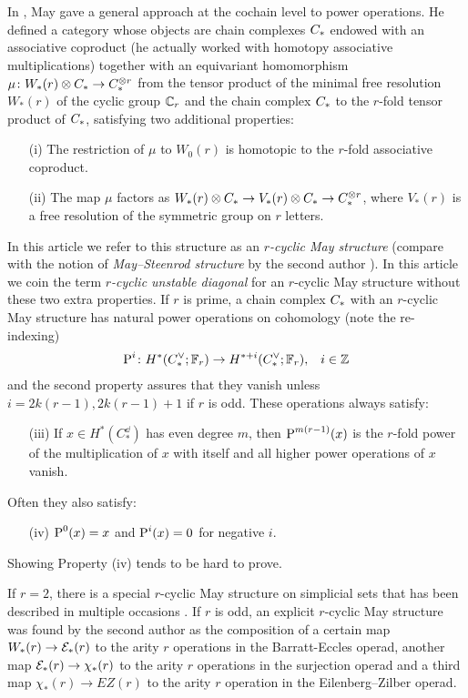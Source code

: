 In \cite{may1970general}, May gave a general approach at the cochain level to power operations.
He defined a category whose objects are chain complexes $C_{*}$ endowed with an associative coproduct (he actually worked with homotopy associative multiplications) together with an equivariant homomorphism $\mu \colon W_*(r) \otimes C_{*} \to C_{*}^{\otimes r}$ from the tensor product of the minimal free resolution $W_*(r)$ of the cyclic group $\mathbb{C}_r$ and the chain complex $C_{*}$ to the $r$-fold tensor product of $C_{*}$, satisfying two additional properties:
\begin{itemize}
	\item[(i)] The restriction of $\mu$ to $W_0(r)$ is homotopic to the $r$-fold associative coproduct.
	\item[(ii)] The map $\mu$ factors as $W_*(r) \otimes C_{*} \to V_*(r) \otimes C_{*} \to C_{*}^{\otimes r}$, where $V_*(r)$ is a free resolution of the symmetric group on $r$ letters.
\end{itemize}
In this article we refer to this structure as an \emph{$r$-cyclic May structure} (compare with the notion of \emph{May--Steenrod structure} by the second author \cite{medina2021may_st}).
In this article we coin the term \emph{$r$-cyclic unstable diagonal} for an $r$-cyclic May structure without these two extra properties.
If $r$ is prime, a chain complex $C_{*}$ with an $r$-cyclic May structure has natural power operations on cohomology (note the re-indexing)
\begin{align*}
	\operatorname{P}^i \colon H^*(C^\vee_{*};\mathbb{F}_r)& \to H^{*+i}(C^\vee_{*};\mathbb{F}_r), & i\in \mathbb{Z}
\end{align*}
and the second property assures that they vanish unless $i = 2k(r-1), 2k(r-1)+1$ if $r$ is odd.
These operations always satisfy:
\begin{itemize}
	\item[(iii)] If $x\in H^*(C_*^\dd)$ has even degree $m$, then $\operatorname{P}^{m(r-1)}(x)$ is the $r$-fold power of the multiplication of $x$ with itself and all higher power operations of $x$ vanish.
\end{itemize}
Often they also satisfy:
\begin{enumerate}
	\item[(iv)] $\operatorname{P}^0(x) = x$ and $\operatorname{P}^i(x) = 0$ for negative $i$.
\end{enumerate}
Showing Property (iv) tends to be hard to prove.

If $r=2$, there is a special $r$-cyclic May structure on simplicial sets that has been described in multiple occasions \cite{steenrod1947products, gonzalez-diaz1999steenrod, medina2021fast_sq}.
If $r$ is odd, an explicit $r$-cyclic May structure was found by the second author \cite{medina2021may_st} as the composition of a certain map $W_*(r) \to \mathcal{E}_*(r)$ to the arity $r$ operations in the Barratt-Eccles operad, another map $\mathcal{E}_*(r) \to \chi_*(r)$ to the arity $r$ operations in the surjection operad \cite{berger2004combinatorial} and a third map $\chi_*(r) \to EZ(r)$ to the arity $r$ operation in the Eilenberg--Zilber operad\cite{mcclure2003multivariable}.

